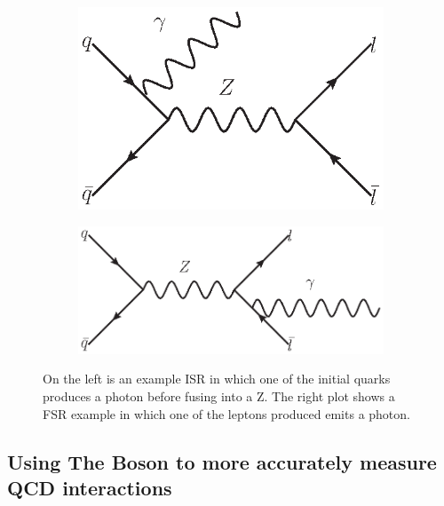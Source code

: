 \begin{figure}[!p]
    \centering
    \begin{subfigure}[b]{\SideBySidePlotWidth}
    \includegraphics[width=\linewidth]{figures/TheoryFigures/ISRExample.eps}
    \caption{}
    \end{subfigure}%
        \begin{subfigure}[b]{\SideBySidePlotWidth}
    \includegraphics[width=1.1\linewidth]{figures/TheoryFigures/FSRExample.eps}
    \caption{}
    \end{subfigure}%
    \caption[FSR and ISR example]{On the left is an example ISR in which one of the initial quarks produces a photon before fusing into a Z. The right plot shows a FSR example in which one of the leptons produced emits a photon.}
    \label{fig:ISRFSR}
\end{figure}
 \subsection{Using The \Z Boson to more accurately measure QCD interactions}

